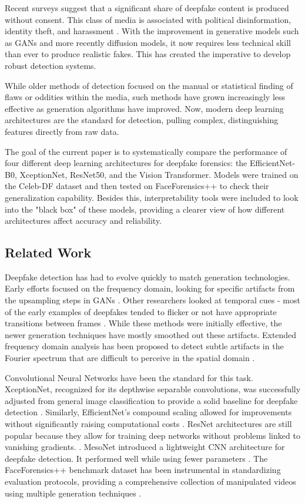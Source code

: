 \documentclass[conference]{IEEEtran}
\begin{document}
Recent surveys suggest that a significant share of deepfake content is produced without consent. This class of media is associated with political disinformation, identity theft, and harassment \cite{deepfake_survey}. With the improvement in generative models such as GANs and more recently diffusion models, it now requires less technical skill than ever to produce realistic fakes. This has created the imperative to develop robust detection systems.

While older methods of detection focused on the manual or statistical finding of flaws or oddities within the media, such methods have grown increasingly less effective as generation algorithms have improved. Now, modern deep learning architectures are the standard for detection, pulling complex, distinguishing features directly from raw data.

The goal of the current paper is to systematically compare the performance of four different deep learning architectures for deepfake forensics: the EfficientNet-B0, XceptionNet, ResNet50, and the Vision Transformer. Models were trained on the Celeb-DF dataset and then tested on FaceForensics++ to check their generalization capability. Besides this, interpretability tools were included to look into the "black box" of these models, providing a clearer view of how different architectures affect accuracy and reliability.

\subsection{Related Work}
Deepfake detection has had to evolve quickly to match generation technologies. Early efforts focused on the frequency domain, looking for specific artifacts from the upsampling steps in GANs \cite{frequency_domain}. Other researchers looked at temporal cues - most of the early examples of deepfakes tended to flicker or not have appropriate transitions between frames \cite{temporal_analysis}. While these methods were initially effective, the newer generation techniques have mostly smoothed out these artifacts. Extended frequency domain analysis has been proposed to detect subtle artifacts in the Fourier spectrum that are difficult to perceive in the spatial domain \cite{frequency_extended}.

Convolutional Neural Networks have been the standard for this task. XceptionNet, recognized for its depthwise separable convolutions, was successfully adjusted from general image classification to provide a solid baseline for deepfake detection \cite{xception_deepfake}. Similarly, EfficientNet's compound scaling allowed for improvements without significantly raising computational costs \cite{efficientnet}. ResNet architectures are still popular because they allow for training deep networks without problems linked to vanishing gradients. \cite{resnet_deepfake}. MesoNet introduced a lightweight CNN architecture for deepfake detection. It performed well while using fewer parameters \cite{mesonet}. The FaceForensics++ benchmark dataset has been instrumental in standardizing evaluation protocols, providing a comprehensive collection of manipulated videos using multiple generation techniques \cite{faceforensics}.
\end{document}
